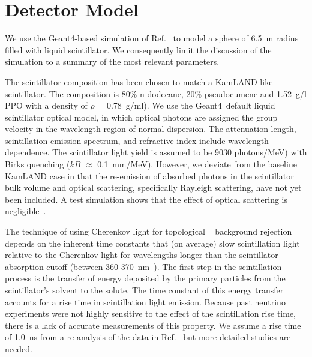 \section{Detector Model}
\label{sec:detector_description}

We use the Geant4-based simulation of Ref.~\cite{Aberle2014}
to model a sphere of 6.5~m radius filled with liquid scintillator. We
consequently limit the discussion of the simulation to a summary of
the most relevant parameters.

The scintillator composition has been chosen to match a KamLAND-like
scintillator\cite{kamland2003}. The composition is 80\% n-dodecane,
20\% pseudocumene and 1.52~g/l PPO with a density of $\rho$ =
0.78~g/ml).  We use the Geant4~default liquid scintillator optical
model, in which optical photons are assigned the group velocity in the
wavelength region of normal dispersion. The attenuation
length\cite{tajimaMaster}, scintillation emission
spectrum\cite{tajimaMaster}, and refractive index\cite{OlegThesis}
include wavelength-dependence. The scintillator light yield is assumed
to be 9030 photons/MeV) with Birks quenching ($kB$ $\approx$
0.1~mm/MeV)\cite{ChrisThesis}. However, we deviate from the
baseline KamLAND case in that the re-emission of absorbed photons in
the scintillator bulk volume and optical scattering, specifically
Rayleigh scattering, have not yet been included. A test simulation
shows that the effect of optical scattering is
negligible~\cite{Aberle2014}.


The technique of using Cherenkov light for topological \B~ background rejection
depends on the inherent time constants that (on average) slow
scintillation light relative to the Cherenkov light for wavelengths
longer than the scintillator absorption cutoff (between
360-370~nm~\cite{scint_cutoff}). The first step in the scintillation
process is the transfer of energy deposited by the primary
particles from the scintillator's solvent to the solute. The time
constant of this energy transfer accounts for a rise time in
scintillation light emission. Because past neutrino experiments were
not highly sensitive to the effect of the scintillation rise time,
there is a lack of accurate measurements of this property. We assume a
rise time of 1.0~ns from a re-analysis of the data in
Ref.~\cite{ChristophThesis} but more detailed studies are needed. 

